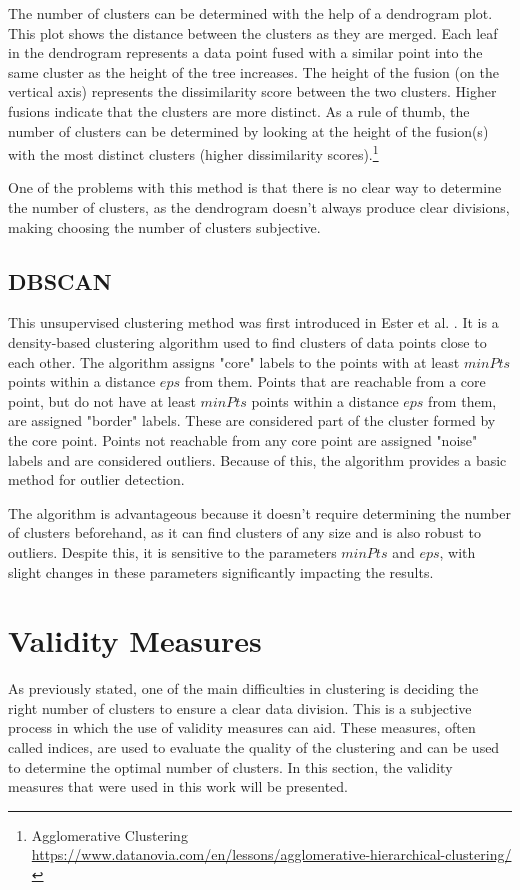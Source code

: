 The number of clusters can be determined with the help of a dendrogram plot. This plot shows the distance between the clusters as they are merged. Each leaf in the dendrogram represents a data point fused with a similar point into the same cluster as the height of the tree increases. The height of the fusion (on the vertical axis) represents the dissimilarity score between the two clusters. Higher fusions indicate that the clusters are more distinct. As a rule of thumb, the number of clusters can be determined by looking at the height of the fusion(s) with the most distinct clusters (higher dissimilarity scores).\footnote{Agglomerative Clustering \url{https://www.datanovia.com/en/lessons/agglomerative-hierarchical-clustering/}}

One of the problems with this method is that there is no clear way to determine the number of clusters, as the dendrogram doesn't always produce clear divisions, making choosing the number of clusters subjective.

\subsection{DBSCAN}\label{sec:dbscan}
This unsupervised clustering method was first introduced in Ester et al. \cite{dbscan}. It is a density-based clustering algorithm used to find clusters of data points close to each other. The algorithm assigns "core" labels to the points with at least $minPts$ points within a distance $eps$ from them. Points that are reachable from a core point, but do not have at least $minPts$ points within a distance $eps$ from them, are assigned "border" labels. These are considered part of the cluster formed by the core point. Points not reachable from any core point are assigned "noise" labels and are considered outliers. Because of this, the algorithm provides a basic method for outlier detection.

The algorithm is advantageous because it doesn't require determining the number of clusters beforehand, as it can find clusters of any size and is also robust to outliers. Despite this, it is sensitive to the parameters $minPts$ and $eps$, with slight changes in these parameters significantly impacting the results.

\section{Validity Measures\label{sec:validity_measures}}
As previously stated, one of the main difficulties in clustering is deciding the right number of clusters to ensure a clear data division. This is a subjective process in which the use of validity measures can aid. These measures, often called indices, are used to evaluate the quality of the clustering and can be used to determine the optimal number of clusters. In this section, the validity measures that were used in this work will be presented.

